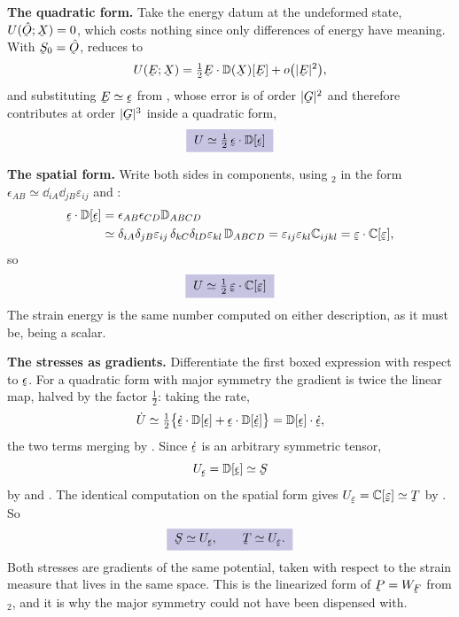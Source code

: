 \begin{solution}
\textbf{The quadratic form.} Take the energy datum at the undeformed
state, $U(\hOb;\bX)=0$, which costs nothing since only differences of
energy have meaning. With $\bS_{0}=\hOb$,  reduces to
\[
   U(\bE;\bX)=\tfrac12\bE\cdot\mathbb{D}(\bX)[\bE]+o\big(|\bE|^{2}\big),
\]
and substituting $\bE\simeq\vek{\epsilon}$ from , whose error
is of order $|\bG|^{2}$ and therefore contributes at order $|\bG|^{3}$
inside a quadratic form,
\[
   \boxed{\;U\simeq\tfrac12\,\vek{\epsilon}\cdot
   \mathbb{D}[\vek{\epsilon}]\;}
\]

\textbf{The spatial form.} Write both sides in components, using
$_{2}$ in the form
$\epsilon_{AB}\simeq\dd_{iA}\dd_{jB}\varepsilon_{ij}$ and :
\[
\begin{aligned}
   \vek{\epsilon}\cdot\mathbb{D}[\vek{\epsilon}]
   &=\epsilon_{AB}\epsilon_{CD}\mathbb{D}_{ABCD}\\
   &\simeq\dd_{iA}\dd_{jB}\varepsilon_{ij}\,
    \dd_{kC}\dd_{lD}\varepsilon_{kl}\,\mathbb{D}_{ABCD}
   =\varepsilon_{ij}\varepsilon_{kl}\mathbb{C}_{ijkl}
   =\vek{\varepsilon}\cdot\mathbb{C}[\vek{\varepsilon}],
\end{aligned}
\]
so
\[
   \boxed{\;U\simeq\tfrac12\,\vek{\varepsilon}\cdot
   \mathbb{C}[\vek{\varepsilon}]\;}
\]
The strain energy is the same number computed on either description, as
it must be, being a scalar.

\textbf{The stresses as gradients.} Differentiate the first boxed
expression with respect to $\vek{\epsilon}$. For a quadratic form with
major symmetry the gradient is twice the linear map, halved by the
factor $\tfrac12$: taking the rate,
\[
   \dot U\simeq\tfrac12\big\{\dot{\vek{\epsilon}}\cdot
   \mathbb{D}[\vek{\epsilon}]+\vek{\epsilon}\cdot
   \mathbb{D}[\dot{\vek{\epsilon}}]\big\}
   =\mathbb{D}[\vek{\epsilon}]\cdot\dot{\vek{\epsilon}},
\]
the two terms merging by . Since $\dot{\vek{\epsilon}}$ is an
arbitrary symmetric tensor,
\[
   U_{\vek{\epsilon}}=\mathbb{D}[\vek{\epsilon}]\simeq\bS
\]
by  and . The identical computation on the spatial
form gives $U_{\vek{\varepsilon}}=\mathbb{C}[\vek{\varepsilon}]\simeq\bT$
by . So
\[
   \boxed{\;\bS\simeq U_{\vek{\epsilon}},\qquad
   \bT\simeq U_{\vek{\varepsilon}} .\;}
\]
Both stresses are gradients of the same potential, taken with respect to
the strain measure that lives in the same space. This is the linearized
form of $\bP=W_{\bF}$ from $_{2}$, and it is why the major
symmetry  could not have been dispensed with.
\end{solution}

